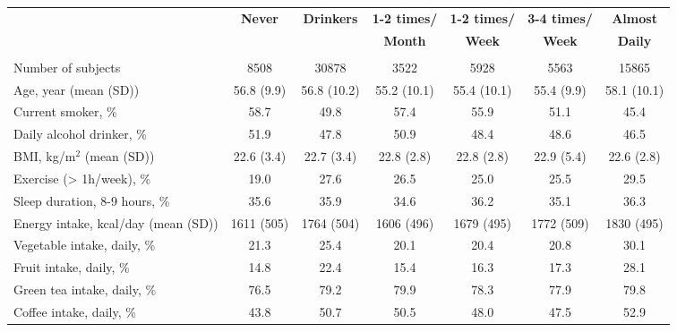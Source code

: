 \documentclass[nutrients,article,submitted,moreauthors,pdftex]{Definitions/mdpi}
\begin{document}
\begin{table}[h]
{\begin{tabular}[t]{lcccccc}
\cmidrule(l{3pt}r{3pt}){4-7}
 & \textbf{Never} & \textbf{Drinkers} & \textbf{1-2 times/} & \textbf{1-2 times/} & \textbf{3-4 times/} & \textbf{Almost}  \\
 &       &         & \textbf{Month}     & \textbf{Week}      & \textbf{Week}         & \textbf{Daily}  \\
\midrule
\rowcolor{gray!6}  \addlinespace[0.3em]
\multicolumn{7}{l}{\textbf{Men (n = 39386)}}\\
\hspace{1em}Number of subjects & 8508 & 30878 & 3522 & 5928 & 5563 & 15865\\
\hspace{1em}Age, year (mean (SD)) & 56.8 (9.9) & 56.8 (10.2) & 55.2 (10.1) & 55.4 (10.1) & 55.4 (9.9) & 58.1 (10.1)\\
\rowcolor{gray!6}  \hspace{1em}Current smoker, \% & 58.7 & 49.8 & 57.4 & 55.9 & 51.1 & 45.4\\
\hspace{1em}Daily alcohol drinker, \% & 51.9 & 47.8 & 50.9 & 48.4 & 48.6 & 46.5\\
\rowcolor{gray!6}  \hspace{1em}BMI, kg/m$^2$ (mean (SD)) & 22.6 (3.4) & 22.7 (3.4) & 22.8 (2.8) & 22.8 (2.8) & 22.9 (5.4) & 22.6 (2.8)\\
\hspace{1em}Exercise (> 1h/week), \% & 19.0 & 27.6 & 26.5 & 25.0 & 25.5 & 29.5\\
\rowcolor{gray!6}  \hspace{1em}Sleep duration, 8-9 hours, \% & 35.6 & 35.9 & 34.6 & 36.2 & 35.1 & 36.3\\
\hspace{1em}Energy intake, kcal/day (mean (SD))  & 1611 (505) & 1764 (504) & 1606 (496) & 1679 (495) & 1772 (509) & 1830 (495)\\
\hspace{1em}Vegetable intake, daily, \% & 21.3 & 25.4 & 20.1 & 20.4 & 20.8 & 30.1\\
\rowcolor{gray!6}  \hspace{1em}Fruit intake, daily, \% & 14.8 & 22.4 & 15.4 & 16.3 & 17.3 & 28.1\\
\hspace{1em}Green tea intake, daily, \% & 76.5 & 79.2 & 79.9 & 78.3 & 77.9 & 79.8\\
\rowcolor{gray!6}  \hspace{1em}Coffee intake, daily, \% & 43.8 & 50.7 & 50.5 & 48.0 & 47.5 & 52.9\\

\end{tabular}}
\end{table}
\end{document}
